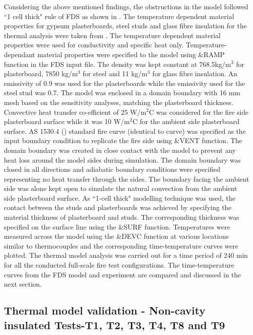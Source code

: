 Considering the above mentioned findings, the obstructions in the model followed ``1 cell thick" rule of FDS as shown in . The temperature dependent material properties for gypsum plasterboards, steel studs and glass fibre insulation for the thermal analysis were taken from \citet{Maneesha2018}. The temperature dependent material properties were used for conductivity and specific heat only. Temperature-dependant material properties were specified to the model using \&RAMP function in the FDS input file. The density was kept constant at 768.5kg/m\(^3\) for plasterboard, 7850 kg/m\(^3\) for steel and 11 kg/m\(^3\) for glass fibre insulation. An emissivity of 0.9 was used for the plasterboards while the emissivity used for the steel stud was 0.7. The model was enclosed in a domain boundary with 16 mm mesh based on the sensitivity analyses, matching the plasterboard thickness. Convective heat transfer co-efficient of 25 W/m$^2$\degree C was considered for the fire side plasterboard surface while it was 10 W/m$^2$\degree C for the ambient side plasterboard surface. AS 1530.4 (\cite{StandardsAustral2014}) standard fire curve (identical to \citet{iso834} curve) was specified as the input boundary condition to replicate the fire side using \&VENT function. The domain boundary was created in close contact with the model to prevent any heat loss around the model sides during simulation. The domain boundary was closed in all directions and adiabatic boundary conditions were specified representing no heat transfer through the sides. The boundary facing the ambient side was alone kept open to simulate the natural convection from the ambient side plasterboard surface. As ``1-cell thick" modelling technique was used, the contact between the studs and plasterboards was achieved by specifying the material thickness of plasterboard and studs. The corresponding thickness was specified on the surface line using the \&SURF function. Temperatures were measured across the model using the \&DEVC function at various locations similar to thermocouples and the corresponding time-temperature curves were plotted. The thermal model analysis was carried out for a time period of 240 min for all the conducted full-scale fire test configurations. The time-temperature curves from the FDS model and experiment are compared and discussed in the next section.  

\subsection{Thermal model validation - Non-cavity insulated Tests-T1, T2, T3, T4, T8 and T9}

